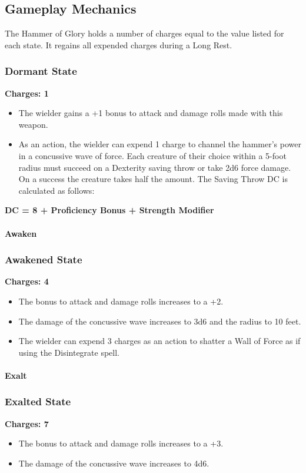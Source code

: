\subsection*{Gameplay Mechanics}
{\entryfont The Hammer of Glory holds a number of charges equal to the value listed for each state. It regains all expended charges during a Long Rest.
\subsubsection*{Dormant State}
\textbf{Charges: 1}
\begin{itemize}
	\item The wielder gains a +1 bonus to attack and damage rolls made with this weapon.
	\item As an action, the wielder can expend 1 charge to channel the hammer's power in a concussive wave of force. Each creature of their choice within a 5-foot radius must succeed on a Dexterity saving throw or take 2d6 force damage. On a success the creature takes half the amount. The Saving Throw DC is calculated as follows:
\end{itemize}
\begin{center}
	\textbf{DC = 8 + Proficiency Bonus + Strength Modifier}
\end{center}
\paragraph*{Awaken}
\subsubsection*{Awakened State}
\textbf{Charges: 4}
\begin{itemize}
	\item The bonus to attack and damage rolls increases to a +2.
	\item The damage of the concussive wave increases to 3d6 and the radius to 10 feet.
	\item The wielder  can expend 3 charges as an action to shatter a Wall of Force as if using the Disintegrate spell.
\end{itemize}
\paragraph*{Exalt}
\subsubsection*{Exalted State}
\textbf{Charges: 7}
\begin{itemize}
	\item The bonus to attack and damage rolls increases to a +3.
	\item The damage of the concussive wave increases to 4d6.
\end{itemize}}